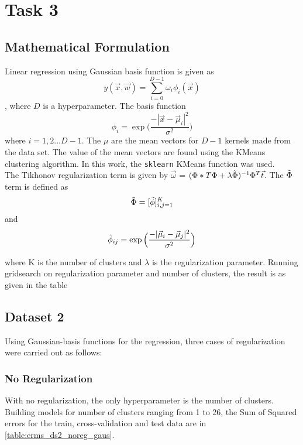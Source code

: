\documentclass[12pt,a4paper]{article}
\newcommand{\noi}{\noindent}
\def\tt#1{\texttt{#1}}
\begin{document}
\break
\section{Task 3}
\subsection{Mathematical Formulation}
Linear regression using Gaussian basis function is given as 
\begin{equation}
    y(\vec{x},\vec{w}) = \sum_{i=0}^{D-1} \omega_{i}\phi_{i}(\vec{x})
\end{equation},
where $D$ is a hyperparameter. The basis function 
\begin{equation}
    \phi_{i} = \exp\Big(\frac{-|\vec{x} - \vec{\mu}_i|^2}{\sigma^2}\Big)
\end{equation}
where $i = 1,2 ... D-1$. The $\mu$ are the mean vectors for $D-1$ kernels made from the data set. The value of the mean vectors are found using the KMeans clustering algorithm. In this work, the \tt{sklearn} KMeans function was used.\\

\noi
The Tikhonov regularization term is given by $\vec{\omega}$ = $(\Phi*T\Phi + \lambda \Tilde{\Phi})^{-1} \Phi^T \vec{t}$. The $\Tilde{\Phi}$ term is defined as 
\begin{equation}
    \Tilde{\Phi} = [\Tilde{\phi}]_{i,j = 1}^{K}
\end{equation}
and 
\begin{equation}
    \Tilde{\phi}_{ij} =  \exp\Big(\frac{-|\vec{\mu}_i - \vec{\mu}_j|^2}{\sigma^2}\Big)
\end{equation}

where K is the number of clusters and $\lambda$ is the regularization parameter. 
Running gridsearch on regularization parameter and number of clusters, the result is as given in the table 


\subsection{Dataset 2}
Using Gaussian-basis functions for the regression, three cases of regularization were carried out as follows:

\subsubsection{No Regularization}
With no regularization, the only hyperparameter is the number of clusters. Building models for number of clusters ranging from 1 to 26, the Sum of Squared errors for the train, cross-validation and test data are in \autoref{table:erms_ds2_noreg_gaus}.

\end{document}
